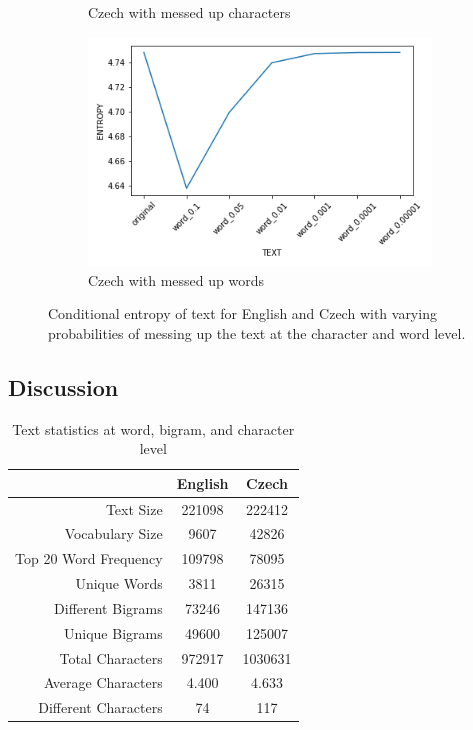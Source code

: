 \documentclass[a4paper]{article}
\begin{document}
\begin{figure}[H]
\begin{subfigure}{0.49\textwidth}
		\caption{Czech with messed up characters}
		\label{fig:cz_char_entropy}
	\end{subfigure}
	\hfill
	\begin{subfigure}{0.49\textwidth}
		\includegraphics[width=\textwidth]{figures/cz_word_entropy}
		\caption{Czech with messed up words}
		\label{fig:cz_word_entropy}
	\end{subfigure}
	\caption{Conditional entropy of text for English and Czech with varying
		probabilities of messing up the text at the character and word level.}
	\label{fig:entropy}
\end{figure}

\subsection{Discussion}

\begin{table}[h]
	\centering
	\caption{Text statistics at word, bigram, and character level}
	\label{tab:stats}
	\begin{tabular}{r|cc}
	 & English & Czech \\
	 \hline
		Text Size & 221098 & 222412 \\
		Vocabulary Size & 9607 & 42826 \\
		Top 20 Word Frequency & 109798 & 78095 \\
		Unique Words & 3811 & 26315 \\
		\hline
		Different Bigrams & 73246 & 147136 \\
		Unique Bigrams & 49600 & 125007 \\
		\hline
		Total Characters & 972917 & 1030631 \\
		Average Characters & 4.400 & 4.633 \\
		Different Characters & 74 & 117 \\
	\end{tabular}
\end{table}
\end{document}
